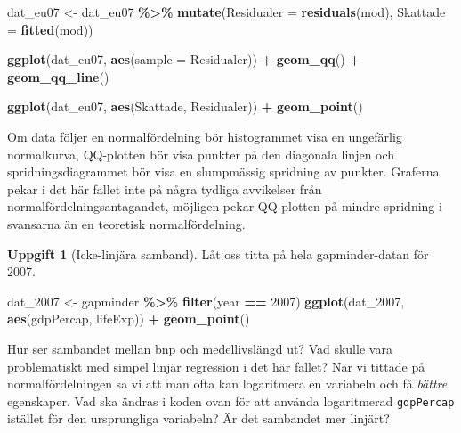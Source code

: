 \documentclass[
]{book}
\newenvironment{Shaded}{\begin{snugshade}}{\end{snugshade}}
\newcommand{\AttributeTok}[1]{\textcolor[rgb]{0.13,0.29,0.53}{#1}}
\newcommand{\DecValTok}[1]{\textcolor[rgb]{0.00,0.00,0.81}{#1}}
\newcommand{\FunctionTok}[1]{\textcolor[rgb]{0.13,0.29,0.53}{\textbf{#1}}}
\newcommand{\NormalTok}[1]{#1}
\newcommand{\OtherTok}[1]{\textcolor[rgb]{0.56,0.35,0.01}{#1}}
\newcommand{\SpecialCharTok}[1]{\textcolor[rgb]{0.81,0.36,0.00}{\textbf{#1}}}
\theoremstyle{definition}
\theoremstyle{definition}
\theoremstyle{definition}
\newtheorem{exercise}{Uppgift}[chapter]
\theoremstyle{definition}
\theoremstyle{remark}
\begin{document}
\begin{Shaded}
\begin{Highlighting}[]
\NormalTok{dat\_eu07 }\OtherTok{\textless{}{-}}\NormalTok{ dat\_eu07 }\SpecialCharTok{\%\textgreater{}\%} 
  \FunctionTok{mutate}\NormalTok{(}\AttributeTok{Residualer =} \FunctionTok{residuals}\NormalTok{(mod),}
         \AttributeTok{Skattade =} \FunctionTok{fitted}\NormalTok{(mod))}

\FunctionTok{ggplot}\NormalTok{(dat\_eu07, }\FunctionTok{aes}\NormalTok{(}\AttributeTok{sample =}\NormalTok{ Residualer)) }\SpecialCharTok{+} 
  \FunctionTok{geom\_qq}\NormalTok{() }\SpecialCharTok{+} \FunctionTok{geom\_qq\_line}\NormalTok{()}
\end{Highlighting}
\end{Shaded}

\begin{Shaded}
\begin{Highlighting}[]
\FunctionTok{ggplot}\NormalTok{(dat\_eu07, }\FunctionTok{aes}\NormalTok{(Skattade, Residualer)) }\SpecialCharTok{+} \FunctionTok{geom\_point}\NormalTok{()}
\end{Highlighting}
\end{Shaded}

Om data följer en normalfördelning bör histogrammet visa en ungefärlig normalkurva, QQ-plotten bör visa punkter på den diagonala linjen och spridningsdiagrammet bör visa en slumpmässig spridning av punkter. Graferna pekar i det här fallet inte på några tydliga avvikelser från normalfördelningsantagandet, möjligen pekar QQ-plotten på mindre spridning i svansarna än en teoretisk normalfördelning.

\begin{exercise}[Icke-linjära samband]
Låt oss titta på hela gapminder-datan för 2007.

\begin{Shaded}
\begin{Highlighting}[]
\NormalTok{dat\_2007 }\OtherTok{\textless{}{-}}\NormalTok{ gapminder }\SpecialCharTok{\%\textgreater{}\%} \FunctionTok{filter}\NormalTok{(year }\SpecialCharTok{==} \DecValTok{2007}\NormalTok{)}
\FunctionTok{ggplot}\NormalTok{(dat\_2007, }\FunctionTok{aes}\NormalTok{(gdpPercap, lifeExp)) }\SpecialCharTok{+} \FunctionTok{geom\_point}\NormalTok{()}
\end{Highlighting}
\end{Shaded}

Hur ser sambandet mellan bnp och medellivslängd ut? Vad skulle vara problematiskt med simpel linjär regression i det här fallet? När vi tittade på normalfördelningen sa vi att man ofta kan logaritmera en variabeln och få \emph{bättre} egenskaper. Vad ska ändras i koden ovan för att använda logaritmerad \texttt{gdpPercap} istället för den ursprungliga variabeln? Är det sambandet mer linjärt?
\end{exercise}
\end{document}
